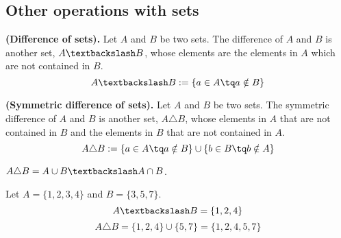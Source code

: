 
\subsection{Other operations with sets}
\begin{definition}
    \textbf{(Difference of sets).} Let $A$ and $B$ be two sets. The difference of $A$ and $B$ is another set, $A\textbackslash B$, whose elements are the elements in $A$ which are not contained in $B$. 
    \begin{equation}
        A\textbackslash B := \{a\in A \tq a\notin B \} 
    \end{equation}
\end{definition}
\begin{definition}
    \textbf{(Symmetric difference of sets).} Let $A$ and $B$ be two sets. The symmetric difference of $A$ and $B$ is another set, $A\triangle B$, whose elements in $A$ that are not contained in $B$ and the elements in $B$ that are not contained in $A$.
    \begin{equation}
        A\triangle B := \{a\in A\tq a\notin B \}\cup \{b\in B\tq b\notin A \}  
    \end{equation}
\end{definition}
\begin{remark}
    $A\triangle B = A\cup B \textbackslash A\cap B$.
\end{remark}
\begin{example}
    Let $A = \{1, 2, 3, 4\} $ and $B = \{3, 5, 7\} $.
    \begin{equation}
        A\textbackslash B = \{1, 2, 4\} 
    \end{equation}
    \begin{equation}
        A\triangle B = \{1, 2, 4\}\cup \{5, 7\} = \{1, 2, 4, 5, 7\}   
    \end{equation}
\end{example}


